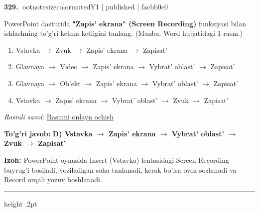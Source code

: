 \documentclass[10pt,a4paper]{article}
\begin{document}
\textbf{\color{ink}329.} {ootnotesizecolor{muted}Y1 | published | facbb0c0}
\par
PowerPoint dasturida \textbf{"Zapis' ekrana" (Screen Recording)} funksiyasi bilan ishlashning to'g'ri ketma-ketligini tanlang. (Manba: Word hujjatidagi 1-rasm.)
\begin{enumerate}[label=\Alph*),leftmargin=9mm]
\item Vstavka \ensuremath{\rightarrow} Zvuk \ensuremath{\rightarrow} Zapis' ekrana \ensuremath{\rightarrow} Zapisat'
\item Glavnaya \ensuremath{\rightarrow} Video \ensuremath{\rightarrow} Zapis' ekrana \ensuremath{\rightarrow} Vybrat' oblast' \ensuremath{\rightarrow} Zapisat'
\item Glavnaya \ensuremath{\rightarrow} Ob'ekt \ensuremath{\rightarrow} Zapis' ekrana \ensuremath{\rightarrow} Vybrat' oblast' \ensuremath{\rightarrow} Zapisat'
\item Vstavka \ensuremath{\rightarrow} Zapis' ekrana \ensuremath{\rightarrow} Vybrat' oblast' \ensuremath{\rightarrow} Zvuk \ensuremath{\rightarrow} Zapisat'
\end{enumerate}
\par\smallskip\textit{Rasmli savol: }\href{https://github.com/sarvar9417/attestatsiya/blob/main/public/kuzgi-demo/demo_q01_powerpoint.svg}{Rasmni onlayn ochish}
\begin{tcolorbox}[enhanced,breakable,colback=teal!4,colframe=teal!55!black,boxrule=0.45pt,arc=1.2mm,left=2.8mm,right=2.8mm,top=2mm,bottom=2mm]
\textbf{\color{teal}To'g'ri javob:} \textbf{D) Vstavka \ensuremath{\rightarrow} Zapis' ekrana \ensuremath{\rightarrow} Vybrat' oblast' \ensuremath{\rightarrow} Zvuk \ensuremath{\rightarrow} Zapisat'}
\par\smallskip
\textbf{Izoh:} PowerPoint oynasida Insert (Vstavka) lentasidagi Screen Recording buyrug'i bosiladi, yoziladigan soha tanlanadi, kerak bo'lsa ovoz sozlanadi va Record orqali yozuv boshlanadi.
\end{tcolorbox}
\vspace{2mm}\hrule height .2pt\vspace{2mm}
\end{document}
